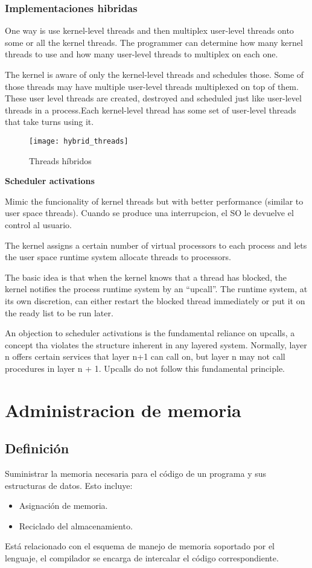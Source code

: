 \documentclass[a4paper, twoside]{article}
\begin{document}
\subsubsection{Implementaciones hibridas}
One way is use kernel-level threads and then multiplex user-level threads onto some or all the kernel threads. The programmer can determine how many kernel threads to use and how many user-level threads to multiplex on each one.

The kernel is aware of only the kernel-level threads and schedules those. Some of those threads may have multiple user-level threads multiplexed on top of them. These user level threads are created, destroyed and scheduled just like user-level threads in a process.Each kernel-level thread has some set of user-level threads that take turns using it.

\begin{figure}[H]
	\centering
	\texttt{[image: hybrid\_threads]}
	\caption{Threads híbridos}
	\label{fig:hybrid_threads}
\end{figure}

\textbf{Scheduler activations}

Mimic the funcionality of kernel threads but with better performance (similar to user space threads).
Cuando se produce una interrupcion, el SO le devuelve el control al usuario.

The kernel assigns a certain number of virtual processors to each process and lets the user space runtime system allocate threads to processors.

The basic idea is that when the kernel knows that a thread has blocked, the kernel notifies the process runtime system by an “upcall”. The runtime system, at its own discretion, can either restart the blocked thread immediately or put it on the ready list to be run later.

An objection to scheduler activations is the fundamental reliance on upcalls, a concept tha violates the structure inherent in any layered system. Normally, layer n offers certain services that layer n+1 can call on, but layer n may not call procedures in layer n + 1. Upcalls do not follow this fundamental principle.

\newpage
\section{Administracion de memoria}
\subsection{Definición}
Suministrar la memoria necesaria para el código de un programa y sus estructuras de datos. Esto incluye:
\begin{itemize}
	\item Asignación de memoria.
	\item Reciclado del almacenamiento.
\end{itemize}
Está relacionado con el esquema de manejo de memoria soportado por el lenguaje, el compilador se encarga de intercalar el código correspondiente.
\end{document}
